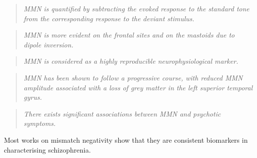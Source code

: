 \begin{quotation}
	\textit{MMN is quantified by subtracting the evoked response to the standard tone from the corresponding response to the deviant stimulus.}
	\begin{flushright}
		\cite{ferri2003mismatch}
	\end{flushright}
\end{quotation}
\begin{quotation}
	\textit{MMN is more evident on the frontal sites and on the mastoids due to dipole inversion.}
	\begin{flushright}
		\cite{alho1986separability}
	\end{flushright}
\end{quotation}
\begin{quotation}
	\textit{MMN is considered as a highly reproducible neurophysiological marker.}
	\begin{flushright}
		\cite{javitt2000intracortical}\cite{umbricht2005mismatch}
	\end{flushright}
\end{quotation}
\begin{quotation}
	\textit{MMN has been shown to follow a progressive course, with reduced MMN amplitude associated with a loss of grey matter in the left superior temporal gyrus.}
	\begin{flushright}
		\cite{salisbury2007progressive}
	\end{flushright}
\end{quotation}
\begin{quotation}
	\textit{There exists significant associations between MMN and psychotic symptoms.}
	\begin{flushright}
		\cite{hall2007genetic}
	\end{flushright}
\end{quotation}
Most works on mismatch negativity show that they are consistent biomarkers in characterising schizophrenia.

